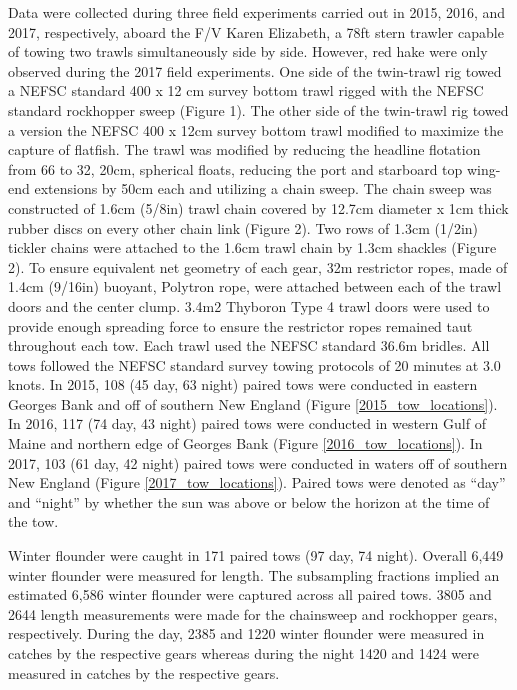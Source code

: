 \documentclass[12pt,letterpaper, leqno]{article}
\begin{document}
Data were collected during three field experiments carried out in 2015, 2016, and 2017, respectively, aboard the F/V Karen Elizabeth, a 78ft stern trawler capable of towing two trawls simultaneously side by side. However, red hake were only observed during the 2017 field experiments. One side of the twin-trawl rig towed a NEFSC standard 400 x 12 cm survey bottom trawl rigged with the NEFSC standard rockhopper sweep \citep[]{politisetal14} (Figure 1). The other side of the twin-trawl rig towed a version the NEFSC 400 x 12cm survey bottom trawl modified to maximize the capture of flatfish. The trawl was modified by reducing the headline flotation from 66 to 32, 20cm, spherical floats, reducing the port and starboard top wing-end extensions by 50cm each and utilizing a chain sweep. The chain sweep was constructed of 1.6cm (5/8in) trawl chain covered by 12.7cm diameter x 1cm thick rubber discs on every other chain link (Figure 2). Two rows of 1.3cm (1/2in) tickler chains were attached to the 1.6cm trawl chain by 1.3cm shackles (Figure 2). To ensure equivalent net geometry of each gear, 32m restrictor ropes, made of 1.4cm (9/16in) buoyant, Polytron rope, were attached between each of the trawl doors and the center clump. 3.4m2 Thyboron Type 4 trawl doors were used to provide enough spreading force to ensure the restrictor ropes remained taut throughout each tow. Each trawl used the NEFSC standard 36.6m bridles. All tows followed the NEFSC standard survey towing protocols of 20 minutes at 3.0 knots. In 2015, 108 (45 day, 63 night) paired tows were conducted in eastern Georges Bank and off of southern New England (Figure \ref{2015_tow_locations}). In 2016, 117 (74 day, 43 night) paired tows were conducted in western Gulf of Maine and northern edge of Georges Bank (Figure \ref{2016_tow_locations}).  In 2017, 103 (61 day, 42 night) paired tows were conducted in waters off of southern New England (Figure \ref{2017_tow_locations}). Paired tows were denoted as ``day'' and ``night''  by whether the sun was above or below the horizon at the time of the tow. 

Winter flounder were caught in 171 paired tows (97 day, 74 night). Overall 6,449  winter flounder were measured for length. The subsampling fractions implied an estimated 6,586 winter flounder were captured across all paired tows. 3805 and 2644 length measurements were made for the chainsweep and rockhopper gears, respectively.  During the day, 2385 and 1220 winter flounder were measured in catches by the respective gears whereas during the night 1420 and 1424 were measured in catches by the respective gears.
\end{document}
